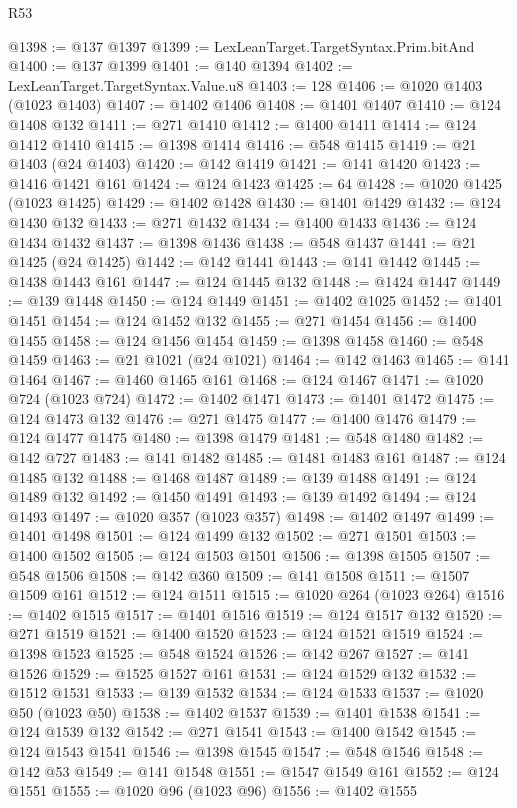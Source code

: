 \begin{lexlean}{R53}
\begin{coremodule}
@1398 := @137 @1397
@1399 := LexLeanTarget.TargetSyntax.Prim.bitAnd
@1400 := @137 @1399
@1401 := @140 @1394
@1402 := LexLeanTarget.TargetSyntax.Value.u8
@1403 := 128
@1406 := @1020 @1403 (@1023 @1403)
@1407 := @1402 @1406
@1408 := @1401 @1407
@1410 := @124 @1408 @132
@1411 := @271 @1410
@1412 := @1400 @1411
@1414 := @124 @1412 @1410
@1415 := @1398 @1414
@1416 := @548 @1415
@1419 := @21 @1403 (@24 @1403)
@1420 := @142 @1419
@1421 := @141 @1420
@1423 := @1416 @1421 @161
@1424 := @124 @1423
@1425 := 64
@1428 := @1020 @1425 (@1023 @1425)
@1429 := @1402 @1428
@1430 := @1401 @1429
@1432 := @124 @1430 @132
@1433 := @271 @1432
@1434 := @1400 @1433
@1436 := @124 @1434 @1432
@1437 := @1398 @1436
@1438 := @548 @1437
@1441 := @21 @1425 (@24 @1425)
@1442 := @142 @1441
@1443 := @141 @1442
@1445 := @1438 @1443 @161
@1447 := @124 @1445 @132
@1448 := @1424 @1447
@1449 := @139 @1448
@1450 := @124 @1449
@1451 := @1402 @1025
@1452 := @1401 @1451
@1454 := @124 @1452 @132
@1455 := @271 @1454
@1456 := @1400 @1455
@1458 := @124 @1456 @1454
@1459 := @1398 @1458
@1460 := @548 @1459
@1463 := @21 @1021 (@24 @1021)
@1464 := @142 @1463
@1465 := @141 @1464
@1467 := @1460 @1465 @161
@1468 := @124 @1467
@1471 := @1020 @724 (@1023 @724)
@1472 := @1402 @1471
@1473 := @1401 @1472
@1475 := @124 @1473 @132
@1476 := @271 @1475
@1477 := @1400 @1476
@1479 := @124 @1477 @1475
@1480 := @1398 @1479
@1481 := @548 @1480
@1482 := @142 @727
@1483 := @141 @1482
@1485 := @1481 @1483 @161
@1487 := @124 @1485 @132
@1488 := @1468 @1487
@1489 := @139 @1488
@1491 := @124 @1489 @132
@1492 := @1450 @1491
@1493 := @139 @1492
@1494 := @124 @1493
@1497 := @1020 @357 (@1023 @357)
@1498 := @1402 @1497
@1499 := @1401 @1498
@1501 := @124 @1499 @132
@1502 := @271 @1501
@1503 := @1400 @1502
@1505 := @124 @1503 @1501
@1506 := @1398 @1505
@1507 := @548 @1506
@1508 := @142 @360
@1509 := @141 @1508
@1511 := @1507 @1509 @161
@1512 := @124 @1511
@1515 := @1020 @264 (@1023 @264)
@1516 := @1402 @1515
@1517 := @1401 @1516
@1519 := @124 @1517 @132
@1520 := @271 @1519
@1521 := @1400 @1520
@1523 := @124 @1521 @1519
@1524 := @1398 @1523
@1525 := @548 @1524
@1526 := @142 @267
@1527 := @141 @1526
@1529 := @1525 @1527 @161
@1531 := @124 @1529 @132
@1532 := @1512 @1531
@1533 := @139 @1532
@1534 := @124 @1533
@1537 := @1020 @50 (@1023 @50)
@1538 := @1402 @1537
@1539 := @1401 @1538
@1541 := @124 @1539 @132
@1542 := @271 @1541
@1543 := @1400 @1542
@1545 := @124 @1543 @1541
@1546 := @1398 @1545
@1547 := @548 @1546
@1548 := @142 @53
@1549 := @141 @1548
@1551 := @1547 @1549 @161
@1552 := @124 @1551
@1555 := @1020 @96 (@1023 @96)
@1556 := @1402 @1555

\end{coremodule}
\end{lexlean}
